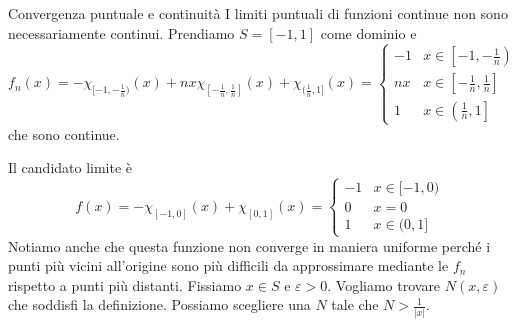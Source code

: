 \documentclass[a4paper]{article}
\begin{document}
\begin{radioactive}
    \begin{snippetexample}{Convergenza puntuale e continuità}
        I limiti puntuali di funzioni continue non sono necessariamente continui.
        Prendiamo \(S = [-1,1]\) come dominio e
        \[
            f_n(x) = -\chi_{[-1, -\frac{1}{n})}(x) + nx \chi_{[-\frac{1}{n}, \frac{1}{n}]}(x) + \chi_{(\frac{1}{n}, 1]}(x)
            =
            \begin{cases}
                -1 & x \in \left[-1, -\frac{1}{n}\right) \\
                nx & x \in \left[-\frac{1}{n}, \frac{1}{n}\right] \\
                1 & x \in \left(\frac{1}{n}, 1\right]
            \end{cases}
        \]
        che sono continue.
        \begin{center}
        \end{center}
        Il candidato limite è \[
            f(x) = -\chi_{[-1, 0]}(x) + \chi_{[0,1]}(x) =
            \begin{cases}
                -1 & x \in [-1, 0) \\
                0 & x = 0 \\
                1 & x \in (0, 1]
            \end{cases}
        \]
        Notiamo anche che questa funzione non converge in maniera uniforme
        perché i punti più vicini all'origine sono più difficili da approssimare mediante le \(f_n\)
        rispetto a punti più distanti.
        Fissiamo \(x \in S\) e \(\varepsilon > 0\).
        Vogliamo trovare \(N(x, \varepsilon)\) che soddisfi la definizione.
        Possiamo scegliere una \(N\) tale che \(N > \frac{1}{|x|}\).
    \end{snippetexample}
\end{radioactive}
\end{document}
